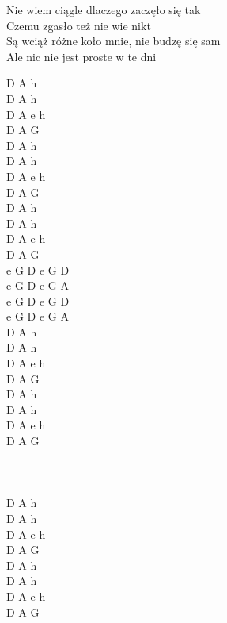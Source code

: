 \documentclass[a5paper, 10pt]{book}
\begin{document}
\begin{minipage}[t]{0.6\textwidth}
  Nie wiem ciągle dlaczego zaczęło się tak\\
  Czemu zgasło też nie wie nikt\\
  Są wciąż różne koło mnie, nie budzę się sam\\
  Ale nic nie jest proste w te dni\\

\end{minipage}
\begin{minipage}[t]{0.4\textwidth}
  D A h\\
  D A h\\
  D A e h\\
  D A G\\

  D A h\\
  D A h\\
  D A e h\\
  D A G\\

  D A h\\
  D A h\\
  D A e h\\
  D A G\\

  \hspace*{3mm} e G D e G D\\
  \hspace*{3mm} e G D e G A\\
  \hspace*{3mm} e G D e G D\\
  \hspace*{3mm} e G D e G A\\

  D A h\\
  D A h\\
  D A e h\\
  D A G\\

  D A h\\
  D A h\\
  D A e h\\
  D A G\\
  ~\\~\\~\\
  D A h\\
  D A h\\
  D A e h\\
  D A G\\

  D A h\\
  D A h\\
  D A e h\\
  D A G\\
\end{minipage}
\end{document}
